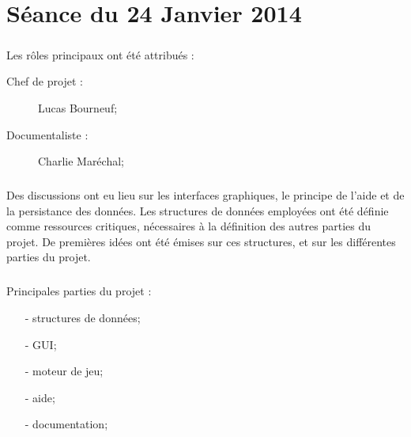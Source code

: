 
\newcommand{\titre}{Compte-rendu de séance}













\chapter*{Séance du 24 Janvier 2014}
    	\paragraph*{}
	Les rôles principaux ont été attribués :
	\begin{description}
		\item[Chef de projet : ] Lucas Bourneuf;
		\item[Documentaliste : ] Charlie Maréchal;
	\end{description}
    	\paragraph*{}
	Des discussions ont eu lieu sur les interfaces graphiques, le principe de l'aide et de la persistance des données.
	Les structures de données employées ont été définie comme ressources critiques, nécessaires à la définition des autres parties du projet. 
	De premières idées ont été émises sur ces structures, et sur les différentes parties du projet.
    	\paragraph*{}
	Principales parties du projet :
	\begin{itemize}
		\item[- structures de données;]
		\item[- GUI;]
		\item[- moteur de jeu;]
		\item[- aide;]
		\item[- documentation;]
	\end{itemize}
